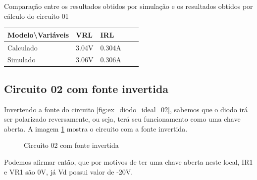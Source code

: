 \begin{quadro}[H]
    \centering
    \caption{Comparação entre os resultados obtidos por simulação e os resultados obtidos por cálculo do circuito 01}
    \begin{tabular}{|C{0.34\textwidth}|C{0.19\textwidth}|C{0.19\textwidth}|C{0.19\textwidth}|C{0.19\textwidth}|}
        \hline
        \textbf{Modelo\textbackslash{}Variáveis} & \textbf{VRL} & \textbf{IRL}\\
        \hline
        Calculado & 3.04V & 0.304A \\
        \hline
        Simulado & 3.06V & 0.306A \\
        \hline
    \end{tabular}
    \vspace{-0.6cm}
    \label{tab:Comparacao1Circuito04}
\end{quadro}

\subsection{Circuito 02 com fonte invertida}

Invertendo a fonte do circuito \ref{fig:ex_diodo_ideal_02}, sabemos que o diodo irá ser polarizado reversamente, ou seja, terá seu funcionamento como uma chave aberta. A imagem \ref{fig:ex_diodo_ideal_02_reverso} mostra o circuito com a fonte invertida.

\begin{figure}[H]
    \centering
    \caption{Circuito 02 com fonte invertida}
    \vspace{-0.3cm}
    \label{fig:ex_diodo_ideal_02_reverso}
\end{figure}

Podemos afirmar então, que por motivos de ter uma chave aberta neste local, IR1 e VR1 são 0V, já Vd possui valor de -20V.


